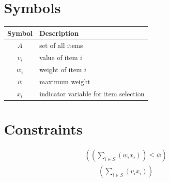 \documentclass{article}
\begin{document}
\section{Symbols}
\begin{table}
\begin{tabular}{c|p{4in}}
  Symbol & Description \\
  \hline \hline
  $A$ & set of all items\\ 
$v_{i}$ & value of item $i$\\ 
$w_{i}$ & weight of item $i$\\ 
$\bar w$ & maximum weight\\ 
$x_{i}$ & indicator variable for item selection\\ 

\hline \hline
\end{tabular}
\end{table}
\section{Constraints}
\begin{align}
((\sum_{i \in S} (w_{i}  x_{i})) \le \bar w)
\end{align}
\begin{align}
(\sum_{i \in S} (v_{i}  x_{i}))
\end{align}
\end{document}
